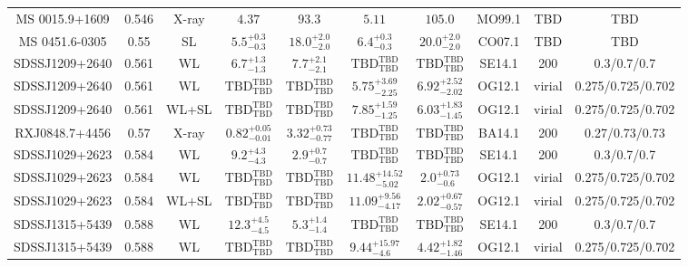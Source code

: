 \begin{table}
\begin{tabular}{cccccccccc}
MS 0015.9+1609 & 0.546 & X-ray & ${4.37}^{}_{}$ & ${93.3}^{}_{}$ & ${5.11}^{}_{}$ & ${105.0}^{}_{}$ & MO99.1 & TBD & TBD \\
MS 0451.6-0305 & 0.55 & SL & ${5.5}^{+0.3}_{-0.3}$ & ${18.0}^{+2.0}_{-2.0}$ & ${6.4}^{+0.3}_{-0.3}$ & ${20.0}^{+2.0}_{-2.0}$ & CO07.1 & TBD & TBD \\
SDSSJ1209+2640 & 0.561 & WL & ${6.7}^{+1.3}_{-1.3}$ & ${7.7}^{+2.1}_{-2.1}$ & ${\mathrm{TBD}}^{\mathrm{TBD}}_{\mathrm{TBD}}$ & ${\mathrm{TBD}}^{\mathrm{TBD}}_{\mathrm{TBD}}$ & SE14.1 & 200 & 0.3/0.7/0.7 \\
SDSSJ1209+2640 & 0.561 & WL & ${\mathrm{TBD}}^{\mathrm{TBD}}_{\mathrm{TBD}}$ & ${\mathrm{TBD}}^{\mathrm{TBD}}_{\mathrm{TBD}}$ & ${5.75}^{+3.69}_{-2.25}$ & ${6.92}^{+2.52}_{-2.02}$ & OG12.1 & virial & 0.275/0.725/0.702 \\
SDSSJ1209+2640 & 0.561 & WL+SL & ${\mathrm{TBD}}^{\mathrm{TBD}}_{\mathrm{TBD}}$ & ${\mathrm{TBD}}^{\mathrm{TBD}}_{\mathrm{TBD}}$ & ${7.85}^{+1.59}_{-1.25}$ & ${6.03}^{+1.83}_{-1.45}$ & OG12.1 & virial & 0.275/0.725/0.702 \\
RXJ0848.7+4456 & 0.57 & X-ray & ${0.82}^{+0.05}_{-0.01}$ & ${3.32}^{+0.73}_{-0.77}$ & ${\mathrm{TBD}}^{\mathrm{TBD}}_{\mathrm{TBD}}$ & ${\mathrm{TBD}}^{\mathrm{TBD}}_{\mathrm{TBD}}$ & BA14.1 & 200 & 0.27/0.73/0.73 \\
SDSSJ1029+2623 & 0.584 & WL & ${9.2}^{+4.3}_{-4.3}$ & ${2.9}^{+0.7}_{-0.7}$ & ${\mathrm{TBD}}^{\mathrm{TBD}}_{\mathrm{TBD}}$ & ${\mathrm{TBD}}^{\mathrm{TBD}}_{\mathrm{TBD}}$ & SE14.1 & 200 & 0.3/0.7/0.7 \\
SDSSJ1029+2623 & 0.584 & WL & ${\mathrm{TBD}}^{\mathrm{TBD}}_{\mathrm{TBD}}$ & ${\mathrm{TBD}}^{\mathrm{TBD}}_{\mathrm{TBD}}$ & ${11.48}^{+14.52}_{-5.02}$ & ${2.0}^{+0.73}_{-0.6}$ & OG12.1 & virial & 0.275/0.725/0.702 \\
SDSSJ1029+2623 & 0.584 & WL+SL & ${\mathrm{TBD}}^{\mathrm{TBD}}_{\mathrm{TBD}}$ & ${\mathrm{TBD}}^{\mathrm{TBD}}_{\mathrm{TBD}}$ & ${11.09}^{+9.56}_{-4.17}$ & ${2.02}^{+0.67}_{-0.57}$ & OG12.1 & virial & 0.275/0.725/0.702 \\
SDSSJ1315+5439 & 0.588 & WL & ${12.3}^{+4.5}_{-4.5}$ & ${5.3}^{+1.4}_{-1.4}$ & ${\mathrm{TBD}}^{\mathrm{TBD}}_{\mathrm{TBD}}$ & ${\mathrm{TBD}}^{\mathrm{TBD}}_{\mathrm{TBD}}$ & SE14.1 & 200 & 0.3/0.7/0.7 \\
SDSSJ1315+5439 & 0.588 & WL & ${\mathrm{TBD}}^{\mathrm{TBD}}_{\mathrm{TBD}}$ & ${\mathrm{TBD}}^{\mathrm{TBD}}_{\mathrm{TBD}}$ & ${9.44}^{+15.97}_{-4.6}$ & ${4.42}^{+1.82}_{-1.46}$ & OG12.1 & virial & 0.275/0.725/0.702 \\

\end{tabular}
\end{table}

